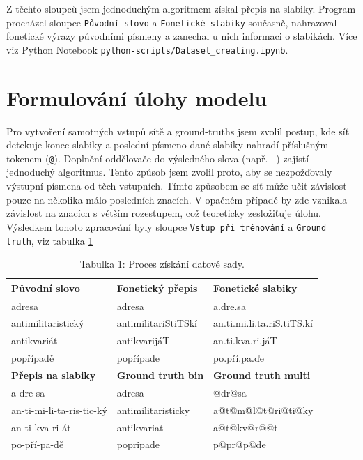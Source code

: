 \documentclass[a4paper]{article}
\theoremstyle{definition}
\begin{document}
Z těchto sloupců jsem jednoduchým algoritmem získal přepis na slabiky. Program procházel sloupce \texttt{Původní slovo} a \texttt{Fonetické slabiky} současně, nahrazoval fonetické výrazy původními písmeny a zanechal u nich informaci o slabikách. Více viz Python Notebook \texttt{python-scripts/Dataset\_creating.ipynb}.

\section{Formulování úlohy modelu}


Pro vytvoření samotných vstupů sítě a ground-truths jsem zvolil postup, kde síť detekuje konec slabiky a poslední písmeno dané slabiky nahradí příslušným tokenem (\texttt{@}). Doplnění oddělovače do výsledného slova (např. \texttt{-}) zajistí jednoduchý algoritmus. Tento způsob jsem zvolil proto, aby se nezpožďovaly výstupní písmena od těch vstupních. Tímto způsobem se síť může učit závislost pouze na několika málo posledních znacích. V opačném případě by zde vznikala závislost na znacích s větším rozestupem, což teoreticky zesložiťuje úlohu. Výsledkem tohoto zpracování byly sloupce \texttt{Vstup při trénování} a \texttt{Ground truth}, viz tabulka \ref{table:dataset}

\begin{table}[]
\centering
\caption{Tabulka 1: Proces získání datové sady.}
\begin{tabular}{|l|l|l|}
\hline
\textbf{Původní slovo}     & \textbf{Fonetický přepis}    & \textbf{Fonetické slabiky} \\ \hline
adresa                     & adresa                       & a.dre.sa                   \\ \hline
antimilitaristický         & antimilitariStiTSkí          & an.ti.mi.li.ta.riS.tiTS.kí \\ \hline
antikvariát                & antikvarijáT                 & an.ti.kva.ri.jáT           \\ \hline
popřípadě                  & popřípaďe                    & po.pří.pa.ďe               \\ \hline
\textbf{Přepis na slabiky} & \textbf{Ground truth bin}    & \textbf{Ground truth multi}      \\ \hline
a-dre-sa                   & adresa                       & @dr@sa                     \\ \hline
an-ti-mi-li-ta-ris-tic-ký  & antimilitaristicky           & a@t@m@l@t@ri@ti@ky         \\ \hline
an-ti-kva-ri-át            & antikvariat                  & a@t@kv@r@@t                \\ \hline
po-pří-pa-dě               & popripade                    & p@pr@p@de                  \\ \hline
\end{tabular}
\label{table:dataset}
\end{table}
\end{document}

